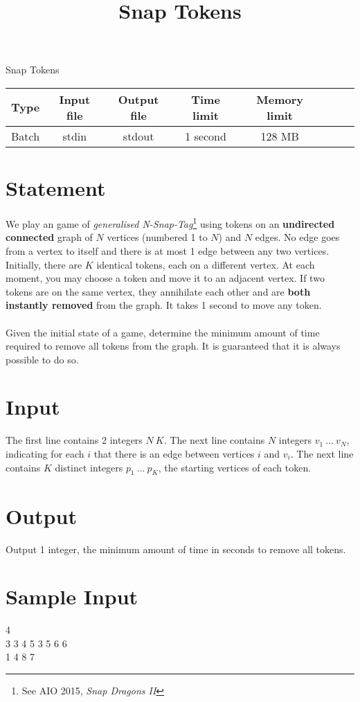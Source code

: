 \documentclass{article}
\title{\vspace{-3ex}Snap Tokens}
\begin{document}
\author{\vspace{-5ex}}
\date{\vspace{-5ex}}
\pagestyle{fancy}
\fancyhf{}
\begin{center}
\huge{Snap Tokens}\small\\
\vspace{5ex}
\begin{tabular}{l*{6}{c}r}
Type & Input file& Output file& Time limit & Memory limit\\
\hline
Batch & stdin & stdout & 1 second & 128 MB
\end{tabular}
\end{center}
\section*{Statement}
We play an game of \textit{generalised N-Snap-Tag}\footnote{See AIO 2015, \textit{Snap Dragons II}} using tokens on an \textbf{undirected connected} graph of $N$ vertices (numbered 1 to $N$) and $N$ edges. No edge goes from a vertex to itself and there is at most 1 edge between any two vertices. Initially, there are $K$ identical tokens, each on a different vertex. At each moment, you may choose a token and move it to an adjacent vertex. If two tokens are on the same vertex, they annihilate each other and are \textbf{both instantly removed} from the graph. It takes 1 second to move any token. \\
\\Given the initial state of a game, determine the minimum amount of time required to remove all tokens from the graph. It is guaranteed that it is always possible to do so.
\section*{Input}
The first line contains 2 integers $N\ K$. The next line contains $N$ integers $v_1\ ... \ v_N$, indicating for each $i$ that there is an edge between vertices $i$ and $v_i$. The next line contains $K$ distinct integers $p_1 \ ... \ p_K$, the starting vertices of each token. 
\section*{Output}
Output 1 integer, the minimum amount of time in seconds to remove all tokens.
\section*{Sample Input}
{ 4\\
3 3 4 5 3 5 6 6\\
1 4 8 7
}
\end{document}
